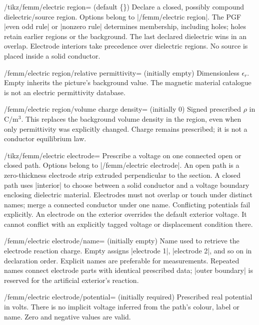 \begin{key}{/tikz/femm/electric region= (default \{\})}
Declare a closed, possibly compound dielectric/source region. Options belong
to |/femm/electric region|. The PGF |even odd rule| or |nonzero rule| determines
membership, including holes; holes retain earlier regions or the background.
The last declared dielectric wins in an overlap. Electrode interiors take
precedence over dielectric regions. No source is placed inside a solid conductor.
\end{key}
\begin{key}{/femm/electric region/relative permittivity= (initially \normalfont empty)}
Dimensionless $\epsilon_r$. Empty inherits the picture's background value.
The magnetic material catalogue is not an electric permittivity database.
\end{key}
\begin{key}{/femm/electric region/volume charge density= (initially 0)}
Signed prescribed $\rho$ in $\mathrm{C/m^3}$. This replaces the background
volume density in the region, even when only permittivity was explicitly
changed. Charge remains prescribed; it is not a conductor equilibrium law.
\end{key}
\begin{key}{/tikz/femm/electric electrode=}
Prescribe a voltage on one connected open or closed path. Options belong to
|/femm/electric electrode|. An open path is a zero-thickness electrode strip
extruded perpendicular to the section. A closed path uses |interior| to choose
between a solid conductor and a voltage boundary enclosing dielectric material.
Electrodes must not overlap or touch under distinct names; merge a connected
conductor under one name. Conflicting potentials fail explicitly.
An electrode on the exterior overrides the default exterior voltage. It cannot
conflict with an explicitly tagged voltage or displacement condition there.
\end{key}
\begin{key}{/femm/electric electrode/name= (initially \normalfont empty)}
Name used to retrieve the electrode reaction charge. Empty assigns
|electrode 1|, |electrode 2|, and so on in declaration order. Explicit names
are preferable for measurements. Repeated names connect electrode parts with identical prescribed data;
|outer boundary| is reserved for the artificial exterior's reaction.
\end{key}
\begin{key}{/femm/electric electrode/potential= (initially \normalfont required)}
Prescribed real potential in volts. There is no implicit voltage inferred from
the path's colour, label or name. Zero and negative values are valid.
\end{key}
